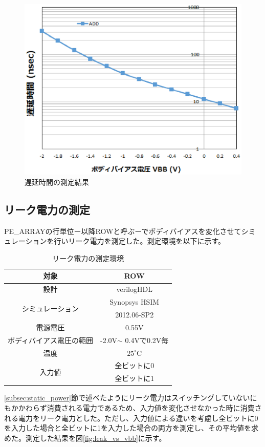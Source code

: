 {\begin{figure}[h]
\centering
\includegraphics[width=12cm]{./chap6/fig/delay_vs_vbb.eps}
\caption{遅延時間の測定結果}
\label{fig:delay_vs_vbb}
\end{figure}

\subsection{リーク電力の測定}
\label{subsec:leak_measure}

PE\_ARRAYの行単位ー以降ROWと呼ぶーでボディバイアスを変化させてシミュレーションを行いリーク電力を測定した。測定環境を以下に示す。

\begin{table}[h]
\centering
\caption{リーク電力の測定環境}
\label{table:calc_leak}
\begin{tabular}{|c|c|} \hline
対象 & ROW \\ \hline
設計 & verilogHDL \\ \hline
\multirow{2}{*}{シミュレーション} & Synopsys HSIM \\
& 2012.06-SP2 \\ \hline
電源電圧 & 0.55V \\ \hline
ボディバイアス電圧の範囲 & -2.0V$\sim$ 0.4Vで0.2V毎 \\ \hline
温度 & $25^\circ$C \\ \hline
\multirow{2}{*}{入力値} & 全ビットに0 \\ 
& 全ビットに1 \\ \hline
\end{tabular}
\end{table}

\ref{subsec:static_power}節で述べたようにリーク電力はスイッチングしていないにもかかわらず消費される電力であるため、入力値を変化させなかった時に消費される電力をリーク電力とした。ただし、入力値による違いを考慮し全ビットに0を入力した場合と全ビットに1を入力した場合の両方を測定し、その平均値を求めた。測定した結果を図\ref{fig:leak_vs_vbb}に示す。

}
